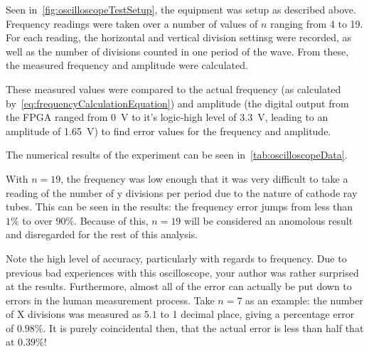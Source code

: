 Seen in~\cref{fig:oscilloscopeTestSetup}, the equipment was setup as described above. Frequency readings
were taken over a number of values of $n$ ranging from 4 to 19. For each
reading, the horizontal and vertical division settinsg were recorded, as well as
the number of divisions counted in one period of the wave. From these, the
measured frequency and amplitude were calculated.

These measured values were compared to the actual frequency (as calculated
by~\cref{eq:frequencyCalculationEquation}) and amplitude (the digital output from the FPGA
ranged from \SI{0}{\V} to it's logic-high level of \SI{3.3}{\V}, leading
to an amplitude of \SI{1.65}{\V}) to find error values for the frequency and
amplitude.

The numerical results of the experiment can be seen
in~\cref{tab:oscilloscopeData}.

With $n=19$, the frequency was low enough that it was very difficult to take a
reading of the number of y divisions per period due to the nature of cathode ray
tubes. This can be seen in the results: the frequency error jumps from less than
$1\%$ to over $90\%$. Because of this, $n=19$ will be considered an anomolous
result and disregarded for the rest of this analysis.

Note the high level of accuracy, particularly with regards to frequency. Due to
previous bad experiences with this oscilloscope, your author was rather
surprised at the results.  Furthermore, almost all of the error can actually be
put down to errors in the human measurement process. Take $n=7$ as an example:
the number of X divisions was measured as $5.1$ to 1 decimal place, giving a
percentage error of $0.98\%$. It is purely coincidental then, that the actual
error is less than half that at $0.39\%$!


